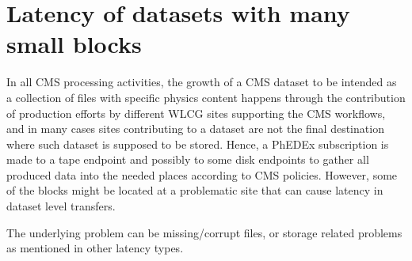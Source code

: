 \section{Latency of datasets with many small blocks}

In all CMS processing activities, the growth of a CMS dataset to be
intended as a collection of files with specific physics content
happens through the contribution of production efforts by different
WLCG sites supporting the CMS workflows, and in many cases sites
contributing to a dataset are not the final destination where such
dataset is supposed to be stored. Hence, a PhEDEx subscription is made
to a tape endpoint and possibly to some disk endpoints to gather all
produced data into the needed places according to CMS
policies. However, some of the blocks might be located at a
problematic site that can cause latency in dataset level transfers.

The underlying problem can be missing/corrupt files, or storage
related problems as mentioned in other latency types.
